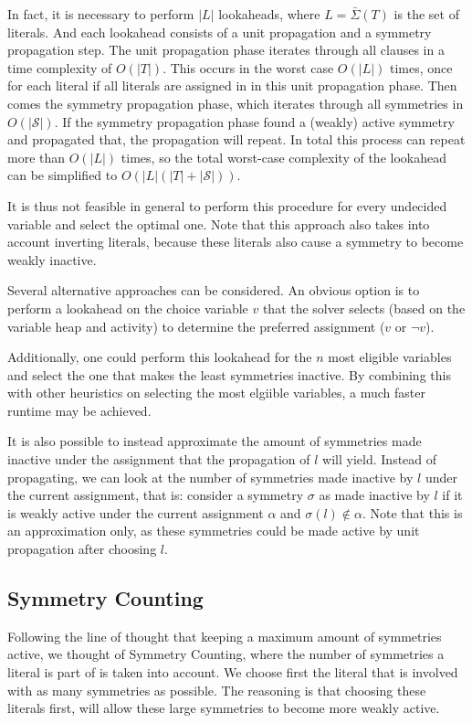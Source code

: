 	In fact, it is necessary to perform $|L|$ lookaheads, where $L = \bar{\Sigma}(T)$ is the set of literals.
	And each lookahead consists of a unit propagation and a symmetry propagation step.
	The unit propagation phase iterates through all clauses in a time complexity of $O(|T|)$.
	This occurs in the worst case $O(|L|)$ times,
	once for each literal if all literals are assigned in in this unit propagation phase.
	Then comes the symmetry propagation phase, which iterates through all symmetries in $O(|\mathcal{S}|)$.
	If the symmetry propagation phase found a (weakly) active symmetry and propagated that,
	the propagation will repeat.
	In total this process can repeat more than $O(|L|)$ times,
	so the total worst-case complexity of the lookahead can be simplified to $O(|L|(|T| + |\mathcal{S}|))$.
	

	It is thus not feasible in general to perform this procedure for every undecided variable and
	select the optimal one.
	Note that this approach also takes into account inverting literals,
	because these literals also cause a symmetry to become weakly inactive.
	
	Several alternative approaches can be considered.
	An obvious option is to perform a lookahead on the choice variable $v$ that the solver
	selects (based on the variable heap and activity) to determine the
	preferred assignment ($v$ or $\neg v$).

	Additionally, one could perform this lookahead for the $n$ most eligible variables
	and select the one that makes the least symmetries inactive.
	By combining this with other heuristics on selecting the most elgiible variables,
	a much faster runtime may be achieved.

	It is also possible to instead approximate the amount of symmetries made inactive under the
	assignment that the propagation of $l$ will yield.
	Instead of propagating, we can look at the number of symmetries made inactive by $l$
	under the current assignment, that is: consider a symmetry $\sigma$ as
	made inactive by $l$ if it is weakly active under the current assignment $\alpha$ and
	$\sigma(l) \notin \alpha$.
	Note that this is an approximation only, as these symmetries could be made active by
	unit propagation after choosing $l$.

\subsection{Symmetry Counting}
	Following the line of thought that keeping a maximum amount of symmetries active,
	we thought of Symmetry Counting, where the number of symmetries a literal is part of is taken into account.
	We choose first the literal that is involved with as many symmetries as possible.
	The reasoning is that choosing these literals first, will allow these large symmetries to become more weakly active.

